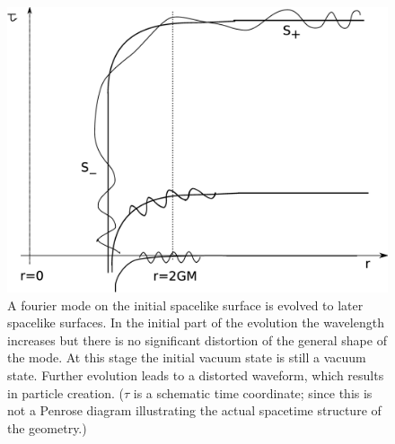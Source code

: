 \documentclass[12pt]{article}
\begin{document}
\begin{figure}[tp]
\centerline{\includegraphics[scale=.17]{matffourt.eps}}
%
%
\caption{A fourier mode on the initial spacelike surface is evolved  to later spacelike surfaces. In the initial part of the evolution the wavelength increases but there is no significant distortion of the general shape of the mode. At this stage the initial vacuum state is still a vacuum state. Further evolution leads to a distorted waveform, which results in particle creation. ($\tau$ is a schematic time coordinate; since this is not a Penrose diagram illustrating the actual spacetime structure of the geometry.)}
\label{matffourt}       %
\end{figure}
\end{document}
